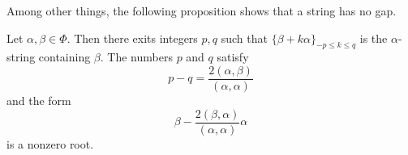 Among other things, the following proposition shows that a string has no gap.
\begin{proposition}     \label{Proppqasbabaa}
    Let \( \alpha,\beta\in\Phi\). Then there exits integers \( p,q\) such that \( \{ \beta+k\alpha \}_{-p\leq k\leq q} \) is the \( \alpha\)-string containing \( \beta\). The numbers \( p\) and \( q\) satisfy
    \begin{equation}        \label{Eq2qbaaapmq}
        p-q=\frac{ 2(\alpha,\beta) }{ (\alpha,\alpha) }
    \end{equation}
    and the form
    \begin{equation}
        \beta-\frac{ 2(\beta,\alpha) }{ (\alpha,\alpha) }\alpha
    \end{equation}
    is a nonzero root.
\end{proposition}

